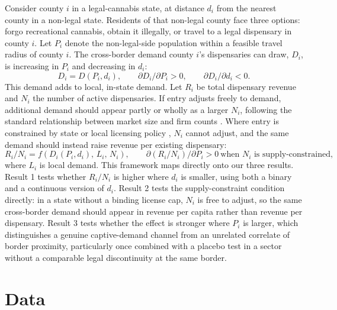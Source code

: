 \documentclass[12pt]{article}
\begin{document}
Consider county $i$ in a legal-cannabis state, at distance $d_i$ from the nearest county in a non-legal
state. Residents of that non-legal county face three options: forgo recreational cannabis, obtain it
illegally, or travel to a legal dispensary in county $i$. Let $P_i$ denote the non-legal-side population
within a feasible travel radius of county $i$. The cross-border demand county $i$'s dispensaries can draw,
$D_i$, is increasing in $P_i$ and decreasing in $d_i$:
\begin{equation}
D_i = D(P_i, d_i), \qquad \partial D_i/\partial P_i > 0, \qquad \partial D_i / \partial d_i < 0.
\end{equation}
This demand adds to local, in-state demand. Let $R_i$ be total dispensary revenue and $N_i$ the number of
active dispensaries. If entry adjusts freely to demand, additional demand should appear partly or wholly as
a larger $N_i$, following the standard relationship between market size and firm counts
\citep{BresnahanReiss1991}. Where entry is constrained by state or local licensing policy
\citep{HollenbeckUetake2021,Yaskewich2022}, $N_i$ cannot adjust, and the same demand should instead raise
revenue per existing dispensary:
\begin{equation}
R_i/N_i = f(D_i(P_i,d_i),\, L_i,\, N_i), \qquad \partial(R_i/N_i)/\partial P_i > 0 \ \text{when } N_i \text{ is supply-constrained},
\end{equation}
where $L_i$ is local demand. This framework maps directly onto our three results. Result 1 tests whether
$R_i/N_i$ is higher where $d_i$ is smaller, using both a binary and a continuous version of $d_i$. Result 2
tests the supply-constraint condition directly: in a state without a binding license cap, $N_i$ is free to
adjust, so the same cross-border demand should appear in revenue per capita rather than revenue per
dispensary. Result 3 tests whether the effect is stronger where $P_i$ is larger, which distinguishes a
genuine captive-demand channel from an unrelated correlate of border proximity, particularly once combined
with a placebo test in a sector without a comparable legal discontinuity at the same border.

\section{Data}
\label{sec:data}
\end{document}
